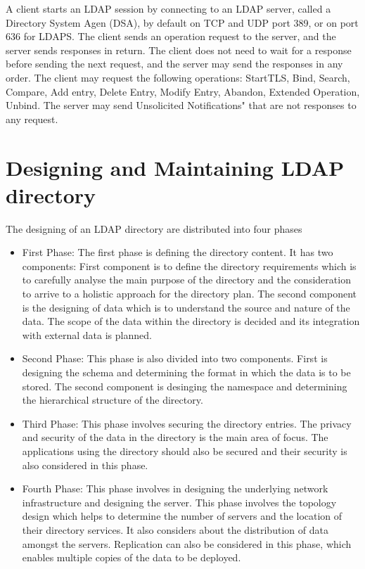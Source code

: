 \documentclass[9pt,twocolumn,twoside]{styles/osajnl}
\begin{document}
A client starts an LDAP session by connecting to an LDAP server,
called a Directory System Agen (DSA), by default on TCP and UDP port
389, or on port 636 for LDAPS. The client sends an operation request
to the server, and the server sends responses in return. The client
does not need to wait for a response before sending the next request,
and the server may send the responses in any order. The client may request
the following operations: StartTLS, Bind, Search, Compare, Add entry,
Delete Entry, Modify Entry, Abandon, Extended Operation, Unbind. The
server may send Unsolicited Notifications" that are not responses to any
request.

\section{Designing and Maintaining LDAP directory}
The designing of an LDAP directory are distributed into four phases
\cite{www-ldap-design}
\begin{itemize}
\item First Phase: The first phase is defining the directory
  content. It has two components: First component is to define the
  directory requirements which is to carefully analyse the main
  purpose of the directory and the consideration to arrive to a
  holistic approach for the directory plan.  The second component is
  the designing of data which is to understand the source and nature
  of the data. The scope of the data within the directory is decided
  and its integration with external data is
  planned. \cite{www-ldap-design}

\item Second Phase: This phase is also divided into two
  components. First is designing the schema and determining the format
  in which the data is to be stored. The second component is desinging
  the namespace and determining the hierarchical structure of the
  directory.

\item Third Phase: This phase involves securing the directory
  entries. The privacy and security of the data in the directory is
  the main area of focus.  The applications using the directory should
  also be secured and their security is also considered in this phase.

\item Fourth Phase: This phase involves in designing the underlying
  network infrastructure and designing the server. This phase involves
  the topology design which helps to determine the number of servers
  and the location of their directory services. It also considers
  about the distribution of data amongst the servers. Replication can
  also be considered in this phase, which enables multiple copies of
  the data to be deployed. \cite{www-ldap-design}
  
\end{itemize}
\end{document}
